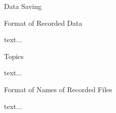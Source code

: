 \chap Data Saving

\sec Format of Recorded Data

text...

\sec Topics

text...

\sec Format of Names of Recorded Files

text...


